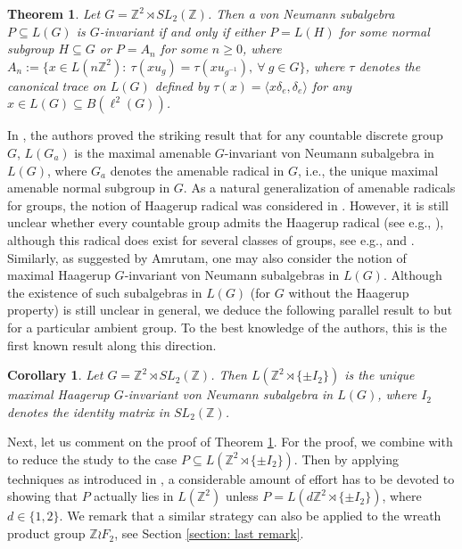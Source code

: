 \documentclass[12pt]{amsart}
\newtheorem{cor}[theorem]{Corollary}
\newtheorem{thm}[theorem]{Theorem}
\theoremstyle{definition}
\theoremstyle{remark}
\begin{document}
\begin{thm}\label{thm}
Let $G=\mathbb{Z}^2\rtimes SL_2(\mathbb{Z})$. Then a von Neumann subalgebra $P\subseteq L(G)$ is $G$-invariant if and only if either $P=L(H)$ for some normal subgroup $H\subseteq G$ or $P=A_n$ for some $n\geq 0$, where $A_n:=\{x\in L(n\mathbb{Z}^2):~\tau(xu_g)=\tau(xu_{g^{-1}}), ~\forall~g\in G\}$, where $\tau$ denotes the canonical trace on $L(G)$ defined by $\tau(x)=\langle x\delta_e, \delta_e\rangle$ for any $x\in L(G)\subseteq B(\ell^2(G))$. 
\end{thm}
In \cite{aho}, the authors proved the striking result that for any countable discrete group $G$, $L(G_a)$ is the maximal amenable $G$-invariant von Neumann subalgebra in $L(G)$, where  $G_a$ denotes the amenable radical in $G$, i.e., the unique maximal amenable normal subgroup in $G$.
As a natural generalization of amenable radicals for groups, the notion of Haagerup radical was considered in \cite{jiangskalski}. However, it is still unclear whether every countable group admits the Haagerup radical (see e.g., \cite[Question 2.11]{jiangskalski}), although this radical does exist for several classes of groups, see e.g., \cite[Proposition 2.10]{jiangskalski} and \cite[Proposition 4.1]{val}. Similarly, as suggested by Amrutam, one may also consider the notion of maximal Haagerup $G$-invariant von Neumann subalgebras in $L(G)$. Although the existence of such subalgebras in $L(G)$ (for $G$ without the Haagerup property) is still unclear in general, we deduce the following parallel result to \cite[Theorem A]{aho} but for a particular ambient group. To the best knowledge of the authors, this is the first known result along this direction. 
\begin{cor}\label{cor}
Let $G=\mathbb{Z}^2\rtimes SL_2(\mathbb{Z})$. Then $L(\mathbb{Z}^2\rtimes \{\pm I_2\})$ is the unique maximal Haagerup $G$-invariant von Neumann subalgebra in $L(G)$, where $I_2$ denotes the identity matrix in $SL_2(\mathbb{Z})$.
\end{cor}


Next, let us comment on the proof of Theorem \ref{thm}.
For the proof, we combine \cite[Theorem 5.1]{cds} with \cite[Theorem A]{aho} to  reduce the study to the case $P\subseteq L(\mathbb{Z}^2\rtimes \{\pm I_2\})$. Then by applying techniques as introduced in \cite{aj}, a considerable amount of effort has to be devoted to showing that $P$ actually lies in $L(\mathbb{Z}^2)$ unless $P=L(d\mathbb{Z}^2\rtimes \{\pm I_2\})$, where $d\in\{1, 2\}$.
We remark that a similar strategy can also be applied to the wreath product group $\mathbb{Z}\wr F_2$, see Section \ref{section: last remark}.
\end{document}
